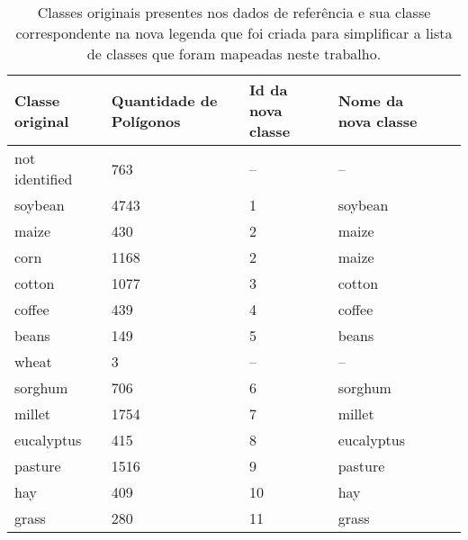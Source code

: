 

\begin{table}[H]
\caption{Classes originais presentes nos dados de referência e sua classe correspondente na nova legenda que foi criada para simplificar a lista de classes que foram mapeadas neste trabalho.}
\label{tab:classes_remapeadas}
\centering
\begin{adjustbox}{width=0.5\textwidth}
\begin{tabular}{|l|l|l|l|l|}
\hline
\textbf{Classe original}   & \textbf{Quantidade de Polígonos} & \textbf{Id da nova classe} & \textbf{Nome da nova classe} \\ \hline
not identified    & 763                     & --                & --                 \\ \hline
soybean           & 4743                    & 1                 & soybean            \\ \hline
maize             & 430                     & 2                 & maize              \\ \hline
corn              & 1168                    & 2                 & maize              \\ \hline
cotton            & 1077                    & 3                 & cotton             \\ \hline
coffee            & 439                     & 4                 & coffee             \\ \hline
beans             & 149                     & 5                 & beans              \\ \hline
wheat             & 3                       & --                & --                 \\ \hline
sorghum           & 706                     & 6                 & sorghum            \\ \hline
millet            & 1754                    & 7                 & millet             \\ \hline
eucalyptus        & 415                     & 8                 & eucalyptus         \\ \hline
pasture           & 1516                    & 9                 & pasture            \\ \hline
hay               & 409                     & 10                & hay                \\ \hline
grass             & 280                     & 11                & grass              \\ \hline

\end{tabular}
\end{adjustbox}
\end{table}
